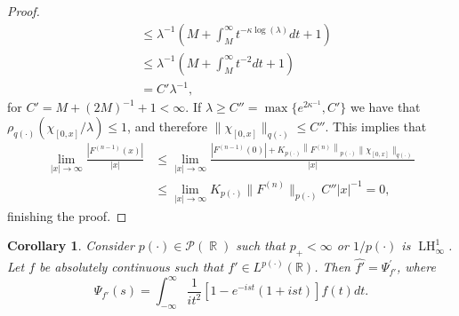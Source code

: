 \documentclass[11pt,reqno]{amsart}
\newtheorem{corollary}[theorem]{Corollary}
\theoremstyle{definition}
\theoremstyle{definition}
\theoremstyle{definition}
\DeclareMathOperator{\R}{\mathbb{R}}
\newcommand{\p}{p(\cdot)}
\newcommand{\q}{q(\cdot)}
\newcommand{\LH}{\operatorname{LH}_\infty^1}
\begin{document}
\begin{proof}
\begin{align*}
        &\leq \lambda^{-1}\left(M+\int_M^\infty t^{-\kappa\log(\lambda)}dt+1\right)\\
        &\leq \lambda^{-1}\left(M+\int_M^\infty t^{-2} dt+1\right)\\
        &=C'\lambda^{-1},
  \end{align*}
  for $C'=M+(2M)^{-1}+1<\infty$.  
  If $\lambda\geq C''=\max\{e^{2\kappa^{-1}},C'\}$ we have that  $\rho_{\q}(\chi_{[0,x]}/\lambda)\leq 1$, and therefore $\|\chi_{[0,x]}\|_{\q}\leq C''$. This implies that
    \begin{align*}   \lim_{|x|\to\infty}\frac{|F^{(n-1)}(x)|}{|x|}&\leq \lim_{|x|\to\infty}\frac{\left|F^{(n-1)}(0)\right|+K_{\p}\left\|F^{(n)}\right\|_{\p}\|\chi_{[0,x]}\|_{q(\cdot)}}{|x|}\\
    &\leq \lim_{|x|\to\infty}K_{\p}\|F^{(n)}\|_{\p}C''|x|^{-1}=0,
    \end{align*}
    finishing the proof.
\end{proof}
\begin{corollary}
     Consider $\p\in\mathcal{P}(\R)$ such that $p_{+}<\infty$ or $1/\p$ is $\LH$. Let $f$ be absolutely continuous such that $f' \in L^{\p}(\mathbb{R})$. Then $\widehat{f'}=\Psi_{f'}^{\prime}$, where
\begin{equation}
\Psi_{f'}(s)=\int_{-\infty}^{\infty} \frac{1}{{i}t^2}\left[1-{e}^{-{i} s t}(1+ist)\right] f(t) {d} t.
\end{equation}
\end{corollary}
\end{document}
